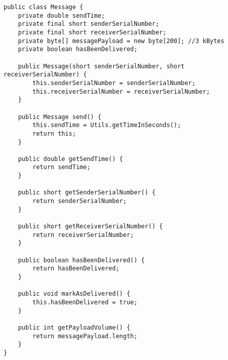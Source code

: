 \begin{lstlisting}
public class Message {
    private double sendTime;
    private final short senderSerialNumber;
    private final short receiverSerialNumber;
    private byte[] messagePayload = new byte[200]; //3 kBytes
    private boolean hasBeenDelivered;

    public Message(short senderSerialNumber, short receiverSerialNumber) {
        this.senderSerialNumber = senderSerialNumber;
        this.receiverSerialNumber = receiverSerialNumber;
    }

    public Message send() {
        this.sendTime = Utils.getTimeInSeconds();
        return this;
    }

    public double getSendTime() {
        return sendTime;
    }

    public short getSenderSerialNumber() {
        return senderSerialNumber;
    }

    public short getReceiverSerialNumber() {
        return receiverSerialNumber;
    }

    public boolean hasBeenDelivered() {
        return hasBeenDelivered;
    }

    public void markAsDelivered() {
        this.hasBeenDelivered = true;
    }

    public int getPayloadVolume() {
        return messagePayload.length;
    }
}
\end{lstlisting}
